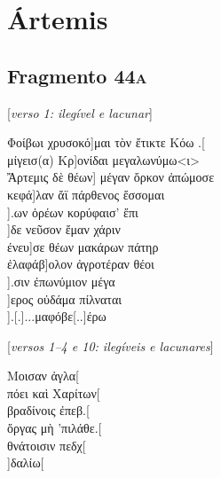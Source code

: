 \chapter{Ártemis}

\section{Fragmento 44\textsc{a}}

\begin{gkverse}
\textnormal{[\emph{verso 1: ilegível e lacunar}]}

Φοίβωι χρυσοκό]μαι τὸν ἔτικτε Κόω .[\\
μίγεισ(α)         Κρ]ονίδαι μεγαλωνύμω<ι>\\
Ἄρτεμις δὲ θέων] μέγαν ὄρκον ἀπώμοσε\\
    κεφά]λαν ἄϊ πάρθενος ἔσσομαι\\
             ].ων ὀρέων κορύφαισ’ ἔπι\\
    ]δε νεῦσον ἔμαν χάριν\\
         ένευ]σε θέων μακάρων πάτηρ\\
ἐλαφάβ]ολον ἀγροτέραν θέοι\\
            ].σιν ἐπωνύμιον μέγα\\
   ]ερος οὐδάμα πίλναται\\
     ].[.]...μαφόβε[..]έρω

\textnormal{[\emph{versos 1--4 e 10: ilegíveis e lacunares}]}

Μοισαν ἀγλα[\\
πόει καὶ Χαρίτων[\\
βραδίνοις ἐπεβ.[\\
ὄργας μὴ ’πιλάθε.[\\
θνάτοισιν πεδχ[\\
      ]δαλίω[
\end{gkverse}


\section*{}



